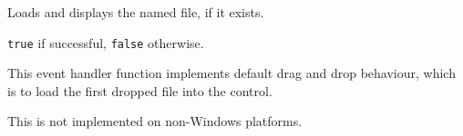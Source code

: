 


\label{wxtextctrlloadfile}


Loads and displays the named file, if it exists.




{\tt true} if successful, {\tt false} otherwise.



\label{wxtextctrlondropfiles}


This event handler function implements default drag and drop behaviour, which
is to load the first dropped file into the control.




This is not implemented on non-Windows platforms.




